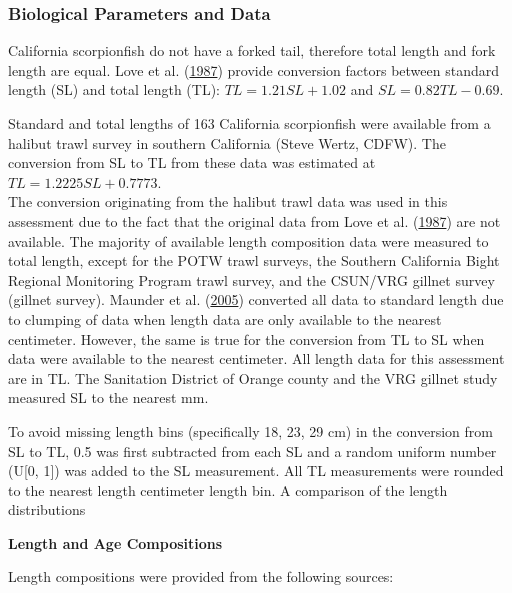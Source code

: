 \documentclass[12pt,]{article}
\begin{document}
\subsubsection{Biological Parameters and
Data}\label{biological-parameters-and-data}

California scorpionfish do not have a forked tail, therefore total
length and fork length are equal. Love et al.
(\protect\hyperlink{ref-Love1987}{1987}) provide conversion factors
between standard length (SL) and total length (TL):
\(TL = 1.21SL + 1.02\) and \(SL = 0.82TL - 0.69\).

Standard and total lengths of 163 California scorpionfish were available
from a halibut trawl survey in southern California (Steve Wertz, CDFW).
The conversion from SL to TL from these data was estimated at
\(TL = 1.2225SL + 0.7773\).\\
The conversion originating from the halibut trawl data was used in this
assessment due to the fact that the original data from Love et al.
(\protect\hyperlink{ref-Love1987}{1987}) are not available. The majority
of available length composition data were measured to total length,
except for the POTW trawl surveys, the Southern California Bight
Regional Monitoring Program trawl survey, and the CSUN/VRG gillnet
survey (gillnet survey). Maunder et al.
(\protect\hyperlink{ref-Maunder2005}{2005}) converted all data to
standard length due to clumping of data when length data are only
available to the nearest centimeter. However, the same is true for the
conversion from TL to SL when data were available to the nearest
centimeter. All length data for this assessment are in TL. The
Sanitation District of Orange county and the VRG gillnet study measured
SL to the nearest mm.

To avoid missing length bins (specifically 18, 23, 29 cm) in the
conversion from SL to TL, 0.5 was first subtracted from each SL and a
random uniform number (U{[}0, 1{]}) was added to the SL measurement. All
TL measurements were rounded to the nearest length centimeter length
bin. A comparison of the length distributions

\textbf{Length and Age Compositions}

Length compositions were provided from the following sources:
\end{document}
